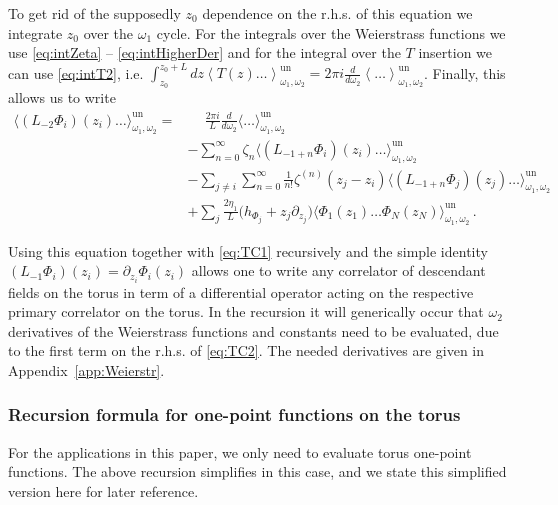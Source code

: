 \documentclass[11pt,a4paper]{article}
\numberwithin{equation}{section}
\begin{document}
\noindent
To get rid of the supposedly $z_0$ dependence on the r.h.s. of this equation we integrate $z_0$ over the $\omega_1$ cycle. For the integrals over the Weierstrass functions we use \eqref{eq:intZeta} -- \eqref{eq:intHigherDer} and for the integral over the $T$ insertion we can use \eqref{eq:intT2}, i.e. 
$\int_{z_0}^{z_0+L} dz \left\langle T(z) \dots \right\rangle_{\omega_1,\omega_2}^\mathrm{un} = 2\pi i \frac{d}{d\omega_2} \left\langle\dots\right\rangle_{\omega_1,\omega_2}^\mathrm{un}$. 
Finally, this allows us to write
%
\begin{align}\label{eq:TC2}
    \big\langle (L_{-2}\Phi_i)(z_i)\dots\big\rangle_{\omega_1,\omega_2}^\mathrm{un} = &\phantom{+} \frac{2\pi  i}{L} \frac{d}{d\omega_2} \big\langle\dots\big\rangle_{\omega_1,\omega_2}^\mathrm{un} 
\nonumber \\
& - \sum_{n=0}^\infty \zeta_n  \big\langle (L_{-1+n}\Phi_i)(z_i)\dots\big\rangle_{\omega_1,\omega_2}^\mathrm{un} 
\nonumber \\
& - \sum_{j\neq i} \sum_{n=0}^\infty\frac{1}{n!} \zeta^{(n)}(z_j-z_i) \big\langle (L_{-1+n}\Phi_j)(z_j)\dots\big\rangle_{\omega_1,\omega_2}^\mathrm{un}
 \\
& + \sum_j \frac{2 \eta_1}{L} \big( h_{\Phi_j} + 
z_j \partial_{z_j}\big) \big\langle \Phi_1(z_1) \dots \Phi_N(z_N)\big\rangle_{\omega_1,\omega_2}^\mathrm{un}\,. \nonumber
\end{align}

\noindent
Using this equation together with \eqref{eq:TC1} recursively and the simple identity $(L_{-1}\Phi_i)(z_i) = \partial_{z_i}\Phi_i(z_i)$ allows one to write any correlator of descendant fields on the torus in term of a differential operator acting on the respective primary correlator on the torus. In the recursion it will generically occur that $\omega_2$ derivatives of the Weierstrass functions and constants need to be evaluated, due to the first term on the r.h.s. of \eqref{eq:TC2}. The needed derivatives are given in Appendix~\ref{app:Weierstr}.

\subsubsection{Recursion formula for one-point functions on the torus}\label{sec:recusion-one-point}

For the applications in this paper, we only need to evaluate torus one-point functions. The above recursion simplifies in this case, and we state this simplified version here for later reference.
\end{document}
